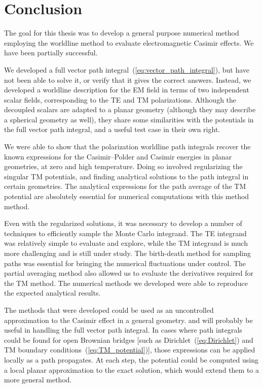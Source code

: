 \chapter{Conclusion}

The goal for this thesis was to develop a general purpose numerical method
employing the worldline method to evaluate electromagnetic Casimir effects. 
We have been partially successful.   %

We developed a full vector path integral~(\ref{eq:vector_path_integral}), but have not 
been able to solve it, or verify that it gives the correct answers.
Instead, we developed a worldline description for the EM field in terms of two independent scalar fields, corresponding 
to the TE and TM polarizations.   
Although the decoupled scalars are adapted to a planar geometry (although they may describe
a spherical geometry as well), they share some similarities with the potentials in the full vector
path integral, and a useful test case in their own right.    

We were able to show that the polarization worldline path integrals recover the known expressions for the 
Casimir--Polder and Casimir energies in planar geometries, at zero and high temperature.  
Doing so involved regularizing the singular TM potentials, and finding analytical solutions to the path integral
in certain geometries.  The analytical expressions for the path average of the TM potential are 
absolutely essential for numerical computations with this method method.  

Even with the regularized solutions, it was necessary to develop a number of techniques to efficiently
sample the Monte Carlo integrand.  The TE integrand was relatively simple to evaluate and explore, while the TM
integrand is much more challenging and is still under study.
The birth-death method for sampling paths was essential for bringing the numerical fluctuations under control.
The partial averaging method also allowed us to evaluate the derivatives required for the TM method.
The numerical methods we developed were able to reproduce the expected analytical results.

The methods that were developed could be used as an uncontrolled approximation to the Casimir effect in a general geometry.
and will probably be useful in handling the full vector path integral.    
In cases where path integrals could be found for open Brownian bridges [such as
Dirichlet~(\ref{eq:Dirichlet}) and TM boundary conditions~(\ref{eq:TM_potential})], 
those expressions can be applied locally as a path propagates.  
At each step, the potential could be computed using a local planar approximation to the exact solution,
which would extend them to a more general method.  

